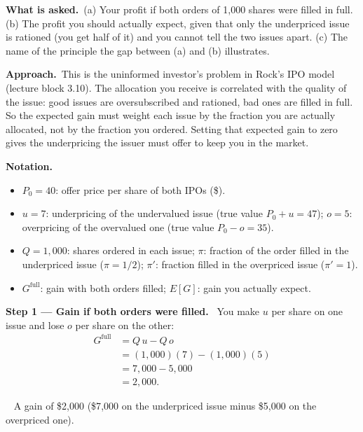 \documentclass[11pt,a4paper]{article}
\newcommand{\notation}{\par\noindent\textbf{Notation.}}
\newcommand{\step}[2]{\par\medskip\noindent\textbf{Step #1 --- #2.}~}
\newcommand{\asked}{\par\medskip\noindent\textbf{What is asked.}~}
\newcommand{\approach}{\par\smallskip\noindent\textbf{Approach.}~}
\newcommand{\answer}[1]{\par\smallskip\noindent\fbox{\textbf{Answer #1.}}~}
\begin{document}
\asked (a) Your profit if both orders of 1{,}000 shares were filled in full. (b) The profit you should actually expect, given that only the underpriced issue is rationed (you get half of it) and you cannot tell the two issues apart. (c) The name of the principle the gap between (a) and (b) illustrates.

\approach This is the uninformed investor's problem in Rock's IPO model (lecture block 3.10). The allocation you receive is correlated with the quality of the issue: good issues are oversubscribed and rationed, bad ones are filled in full. So the expected gain must weight each issue by the fraction you are actually allocated, not by the fraction you ordered. Setting that expected gain to zero gives the underpricing the issuer must offer to keep you in the market.

\notation
\begin{itemize}
  \item $P_0=40$: offer price per share of both IPOs (\$).
  \item $u=7$: underpricing of the undervalued issue (true value $P_0+u=47$); $o=5$: overpricing of the overvalued one (true value $P_0-o=35$).
  \item $Q=1{,}000$: shares ordered in each issue; $\pi$: fraction of the order filled in the underpriced issue ($\pi=1/2$); $\pi'$: fraction filled in the overpriced issue ($\pi'=1$).
  \item $G^{\text{full}}$: gain with both orders filled; $E[G]$: gain you actually expect.
\end{itemize}

\step{1}{Gain if both orders were filled} You make $u$ per share on one issue and lose $o$ per share on the other:
\begin{align}
  G^{\text{full}} &= Q\,u - Q\,o \label{t3e1-full}\\
                  &= (1{,}000)(7)-(1{,}000)(5) \nonumber\\
                  &= 7{,}000-5{,}000 \nonumber\\
                  &= 2{,}000. \nonumber
\end{align}

\answer{(a)} A gain of \$2{,}000 (\$7{,}000 on the underpriced issue minus \$5{,}000 on the overpriced one).
\end{document}
